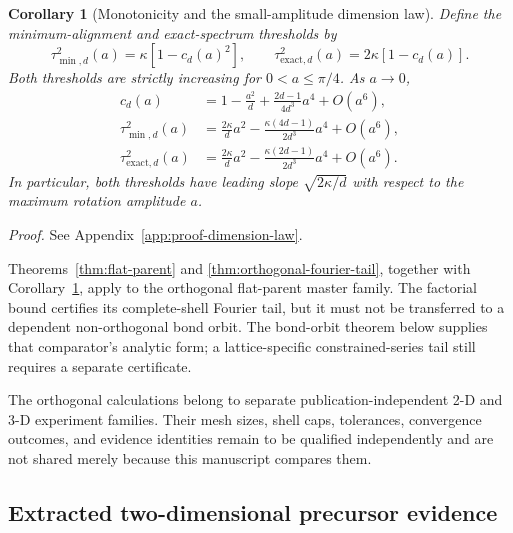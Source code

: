 \documentclass[11pt]{article}
\newenvironment{prospective}{\color{prospectivered}}{}
\newtheorem{corollary}[theorem]{Corollary}
\begin{document}
\begin{corollary}[Monotonicity and the small-amplitude dimension law]
\label{cor:dimension-law}
Define the minimum-alignment and exact-spectrum thresholds by
\begin{equation}
 \tau_{\min,d}^2(a)=\kappa[1-c_d(a)^2],
 \qquad
 \tau_{\mathrm{exact},d}^2(a)=2\kappa[1-c_d(a)].
\end{equation}
Both thresholds are strictly increasing for $0<a\le\pi/4$. As $a\to0$,
\begin{align}
 c_d(a)
 &=1-\frac{a^2}{d}+\frac{2d-1}{4d^3}a^4+O(a^6),
 \label{eq:correlation-small-a}\\
 \tau_{\min,d}^2(a)
 &=\frac{2\kappa}{d}a^2
   -\frac{\kappa(4d-1)}{2d^3}a^4+O(a^6),
 \label{eq:min-threshold-small-a}\\
 \tau_{\mathrm{exact},d}^2(a)
 &=\frac{2\kappa}{d}a^2
   -\frac{\kappa(2d-1)}{2d^3}a^4+O(a^6).
 \label{eq:exact-threshold-small-a}
\end{align}
In particular, both thresholds have leading slope
$\sqrt{2\kappa/d}$ with respect to the maximum rotation amplitude $a$.
\end{corollary}

\noindent\emph{Proof.} See Appendix~\ref{app:proof-dimension-law}.


Theorems~\ref{thm:flat-parent} and \ref{thm:orthogonal-fourier-tail}, together with
Corollary~\ref{cor:dimension-law}, apply to the orthogonal flat-parent master family.
The factorial bound certifies its complete-shell Fourier tail, but it must not be
transferred to a dependent non-orthogonal bond orbit. The bond-orbit theorem below
supplies that comparator's analytic form; a lattice-specific constrained-series tail
still requires a separate certificate.

\begin{prospective}
The orthogonal calculations belong to separate publication-independent 2-D and 3-D
experiment families. Their mesh sizes, shell caps, tolerances, convergence outcomes, and
evidence identities remain to be qualified independently and are not shared merely
because this manuscript compares them.
\end{prospective}

\subsection{Extracted two-dimensional precursor evidence}
\end{document}
